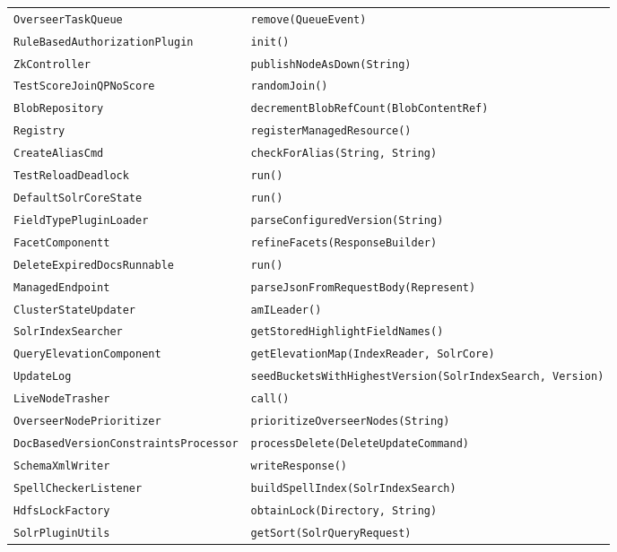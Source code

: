 \begin{center}
\begin{longtable}{ll}
\lstinline/OverseerTaskQueue/&{\lstinline/remove(QueueEvent)/}\\
\lstinline/RuleBasedAuthorizationPlugin/&{\lstinline/init()/}\\
\lstinline/ZkController/&{\lstinline/publishNodeAsDown(String)/}\\
\lstinline/TestScoreJoinQPNoScore/&{\lstinline/randomJoin()/}\\
\lstinline/BlobRepository/&{\lstinline/decrementBlobRefCount(BlobContentRef)/}\\
\lstinline/Registry/&{\lstinline/registerManagedResource()/}\\
\lstinline/CreateAliasCmd/&{\lstinline/checkForAlias(String, String)/}\\
\lstinline/TestReloadDeadlock/&{\lstinline/run()/}\\
\lstinline/DefaultSolrCoreState/&{\lstinline/run()/}\\
\lstinline/FieldTypePluginLoader/&{\lstinline/parseConfiguredVersion(String)/}\\
\lstinline/FacetComponentt/&{\lstinline/refineFacets(ResponseBuilder)/}\\
\lstinline/DeleteExpiredDocsRunnable/&{\lstinline/run()/}\\
\lstinline/ManagedEndpoint/&{\lstinline/parseJsonFromRequestBody(Represent)/}\\
\lstinline/ClusterStateUpdater/&{\lstinline/amILeader()/}\\
\lstinline/SolrIndexSearcher/&{\lstinline/getStoredHighlightFieldNames()/}\\
\lstinline/QueryElevationComponent/&{\lstinline/getElevationMap(IndexReader, SolrCore)/}\\
\lstinline/UpdateLog/&{\lstinline/seedBucketsWithHighestVersion(SolrIndexSearch, Version)/}\\
\lstinline/LiveNodeTrasher/&{\lstinline/call()/}\\
\lstinline/OverseerNodePrioritizer/&{\lstinline/prioritizeOverseerNodes(String)/}\\
\lstinline/DocBasedVersionConstraintsProcessor/&{\lstinline/processDelete(DeleteUpdateCommand)/}\\
\lstinline/SchemaXmlWriter/&{\lstinline/writeResponse()/}\\
\lstinline/SpellCheckerListener/&{\lstinline/buildSpellIndex(SolrIndexSearch)/}\\
\lstinline/HdfsLockFactory/&{\lstinline/obtainLock(Directory, String)/}\\
\lstinline/SolrPluginUtils/&{\lstinline/getSort(SolrQueryRequest)/}\\

\end{longtable}
\end{center}
